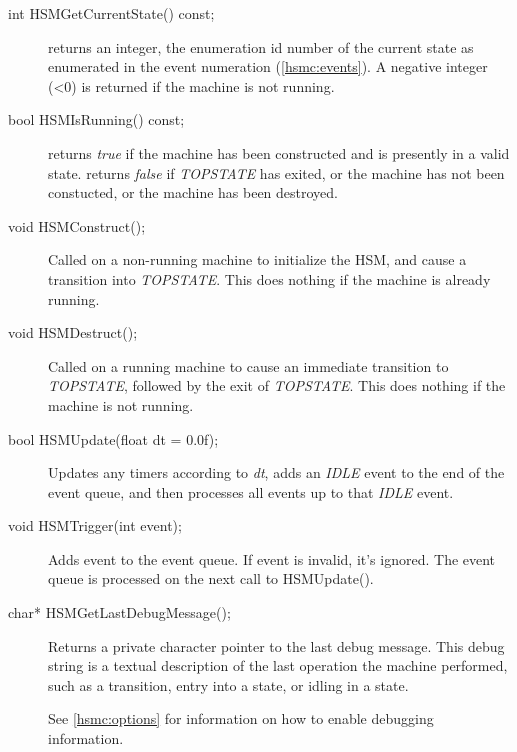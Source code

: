 \documentclass[titlepage,letterpaper]{report}
\begin{document}
\begin{description}

\item[int  HSMGetCurrentState() const;] 

    returns an integer, the enumeration id number of the current state as enumerated 
		in the event numeration (\ref{hsmc:events}).  A negative integer (<0) is returned if 
		the machine is not running.
		
\item[bool HSMIsRunning() const;]

    returns \emph{true} if the machine has been constructed and is presently in a valid state.
		returns \emph{false} if \emph{TOPSTATE} has exited, or the machine has not been constucted, 
		or the machine has been destroyed.

\item[void HSMConstruct();]

    Called on a non-running machine to initialize the HSM, and cause a transition into \emph{TOPSTATE}.  
		This does nothing if the machine is already running.

\item[void HSMDestruct();]

    Called on a running machine to cause an immediate transition to \emph{TOPSTATE}, followed by
		the exit of \emph{TOPSTATE}.  This does nothing if the machine is not running.

\item[bool HSMUpdate(float dt = 0.0f);]

    Updates any timers according to \emph{dt}, adds an \emph{IDLE} event to the end of the event
		queue, and then processes all events up to that \emph{IDLE} event.

\item[void HSMTrigger(int event);]

    Adds event to the event queue.  If event is invalid, it's ignored.  The event queue is processed
		on the next call to HSMUpdate().

\item[char* HSMGetLastDebugMessage();]

    Returns a private character pointer to the last debug message.  This debug string is a textual
		description of the last operation the machine performed, such as a transition, entry into a
		state, or idling in a state.  
		
		See \ref{hsmc:options} for information on how to enable debugging information.


\end{description}
\end{document}

